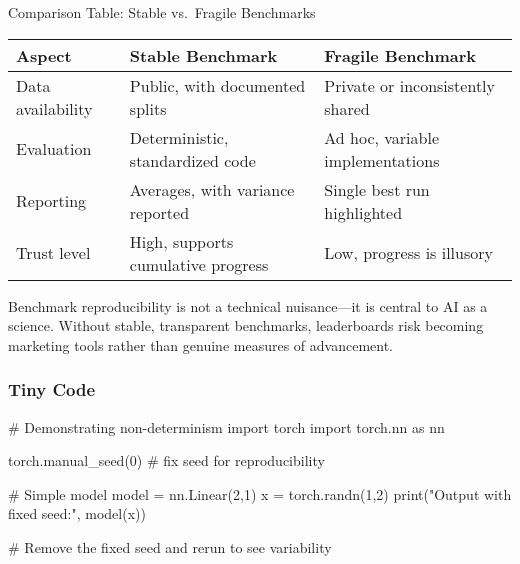 \documentclass[
  letterpaper,
  DIV=11,
  numbers=noendperiod]{scrreprt}
\newenvironment{Shaded}{\begin{snugshade}}{\end{snugshade}}
\newcommand{\BuiltInTok}[1]{\textcolor[rgb]{0.00,0.23,0.31}{#1}}
\newcommand{\CommentTok}[1]{\textcolor[rgb]{0.37,0.37,0.37}{#1}}
\newcommand{\DecValTok}[1]{\textcolor[rgb]{0.68,0.00,0.00}{#1}}
\newcommand{\ImportTok}[1]{\textcolor[rgb]{0.00,0.46,0.62}{#1}}
\newcommand{\NormalTok}[1]{\textcolor[rgb]{0.00,0.23,0.31}{#1}}
\newcommand{\OperatorTok}[1]{\textcolor[rgb]{0.37,0.37,0.37}{#1}}
\newcommand{\StringTok}[1]{\textcolor[rgb]{0.13,0.47,0.30}{#1}}
\begin{document}
Comparison Table: Stable vs.~Fragile Benchmarks

\begin{longtable}[]{@{}
  >{\raggedright\arraybackslash}p{}
  >{\raggedright\arraybackslash}p{}
  >{\raggedright\arraybackslash}p{}@{}}
\toprule\noalign{}
\begin{minipage}[b]{\linewidth}\raggedright
Aspect
\end{minipage} & \begin{minipage}[b]{\linewidth}\raggedright
Stable Benchmark
\end{minipage} & \begin{minipage}[b]{\linewidth}\raggedright
Fragile Benchmark
\end{minipage} \\
\midrule\noalign{}
\endhead
\bottomrule\noalign{}
\endlastfoot
Data availability & Public, with documented splits & Private or
inconsistently shared \\
Evaluation & Deterministic, standardized code & Ad hoc, variable
implementations \\
Reporting & Averages, with variance reported & Single best run
highlighted \\
Trust level & High, supports cumulative progress & Low, progress is
illusory \\
\end{longtable}

Benchmark reproducibility is not a technical nuisance---it is central to
AI as a science. Without stable, transparent benchmarks, leaderboards
risk becoming marketing tools rather than genuine measures of
advancement.

\subsubsection{Tiny Code}\label{tiny-code-97}

\begin{Shaded}
\begin{Highlighting}[]
\CommentTok{\# Demonstrating non{-}determinism}
\ImportTok{import}\NormalTok{ torch}
\ImportTok{import}\NormalTok{ torch.nn }\ImportTok{as}\NormalTok{ nn}

\NormalTok{torch.manual\_seed(}\DecValTok{0}\NormalTok{)   }\CommentTok{\# fix seed for reproducibility}

\CommentTok{\# Simple model}
\NormalTok{model }\OperatorTok{=}\NormalTok{ nn.Linear(}\DecValTok{2}\NormalTok{,}\DecValTok{1}\NormalTok{)}
\NormalTok{x }\OperatorTok{=}\NormalTok{ torch.randn(}\DecValTok{1}\NormalTok{,}\DecValTok{2}\NormalTok{)}
\BuiltInTok{print}\NormalTok{(}\StringTok{"Output with fixed seed:"}\NormalTok{, model(x))}

\CommentTok{\# Remove the fixed seed and rerun to see variability}
\end{Highlighting}
\end{Shaded}
\end{document}

